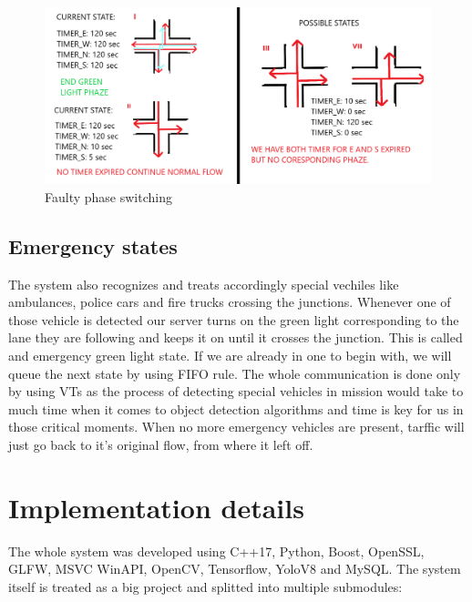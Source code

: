 \documentclass[17pt]{report}
\begin{document}
\begin{figure}[h!]
    \includegraphics[width=\textwidth]{Sketches/phaseSwitchingCaseToBeAvoided.png}
    \caption{Faulty phase switching}
    \label{fig:FaultyphaseSwitching}
\end{figure}

\section{Emergency states}
\indent \indent
The system also recognizes and treats accordingly
special vechiles like ambulances, police cars and fire trucks
crossing the junctions. Whenever one of those vehicle is detected
our server turns on the green light corresponding to the lane they are
following and keeps it on until it crosses the junction. This is called 
and emergency green light state. If we are already
in one to begin with, we will queue the next state by using FIFO rule.
The whole communication is done only by using VTs as the process of detecting 
special vehicles in mission would take to much time when it comes to object 
detection algorithms and time is key for us in those critical moments.
When no more emergency vehicles are present, tarffic will just go 
back to it's original flow, from where it left off.

\pagebreak



\chapter{Implementation details}
\indent \indent
The whole system was developed using C++17, Python, Boost, OpenSSL, GLFW,
MSVC WinAPI, OpenCV, Tensorflow, YoloV8 and MySQL. The system itself is
treated as a big project and splitted into multiple submodules: 
\end{document}
